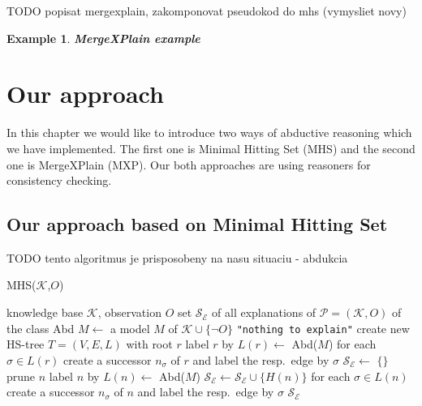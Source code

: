 \documentclass[12pt,a4paper]{article}
\newtheorem{example}{Example}[subsection]
\begin{document}
TODO popisat mergexplain, zakomponovat pseudokod do mhs (vymysliet novy)

\begin{example}{\textbf{MergeXPlain example}}
\end{example}

\section{Our approach}
In this chapter we would like to introduce two ways of abductive reasoning which we have implemented. The first one is Minimal Hitting Set (MHS) and the second one is MergeXPlain (MXP). Our both approaches are using reasoners for consistency checking. 

\subsection{Our approach based on Minimal Hitting Set}

TODO tento algoritmus je prisposobeny na nasu situaciu - abdukcia
\begin{algorithm}[H] 
	\footnotesize
	\caption{MHS($\mathcal{K}$,$O$)} \label{alg:mhs}
	\label{alg:SOA}
	\begin{algorithmic}[1]
		\Require knowledge base $\mathcal{K}$, observation $O$
		\Ensure set $\mathcal{S}_{\mathcal{E}}$ of all explanations of $\mathcal{P}=(\mathcal{K},O)$ of the class Abd
		\State $M \gets$ a model $M$ of $\mathcal{K} \cup \{\neg O\}$
		\label{soal:ta_init}
		\State \Return \texttt{"nothing to explain"} %
		\label{soal:nte}
		\EndIf %
		\label{soal:init:e}
		\State create new HS-tree $T=(V,E,L)$ with root $r$ %
		\label{soal:root:b}
		\State label $r$ by $L(r) \gets$ Abd($M$)
		\label{soal:r-label}
		\State for each $\sigma\in L(r)$ create a successor $n_\sigma$ of $r$
		and label the resp.\ edge by $\sigma$ %
		\label{soal:root:e}
		\State $\mathcal{S}_{\mathcal{E}} \gets$ $\{\}$ %
		\label{soal:SE:init}
		\label{soal:loop:b}
		\label{soal:prune:b}
		\State prune $n$
		\label{soal:prune:e}
		\label{soal:ta}
		\State label $n$ by $L(n) \gets$  Abd($M$) 
		\Else %
		\State $\mathcal{S}_\mathcal{E} \gets \mathcal{S}_\mathcal{E} \cup \{H(n)\}$ 
		\EndIf
		\State for each $\sigma\in L(n)$ create a successor $n_\sigma$ of $n$
		and label the resp.\ edge by $\sigma$ %
		\label{soal:modproc:e}
		\EndWhile
		\label{soal:loop:e}
		\label{soal:output}
		\State \Return $\mathcal{S}_\mathcal{E}$
	\end{algorithmic}
\end{algorithm}
\end{document}
